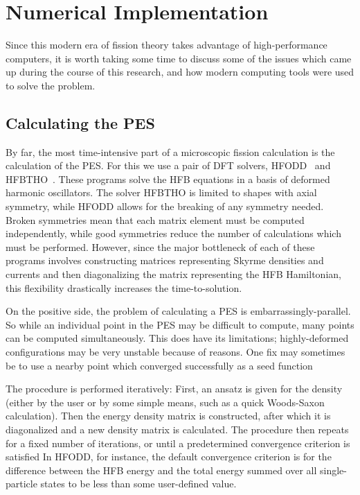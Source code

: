 \chapter{Numerical Implementation}\label{chap:Numerical}

Since this modern era of fission theory takes advantage of high-performance computers, it is worth taking some time to discuss some of the issues which came up during the course of this research, and how modern computing tools were used to solve the problem.

\section{Calculating the PES}
By far, the most time-intensive part of a microscopic fission calculation is the calculation of the PES. For this we use a pair of DFT solvers, HFODD~\cite{Schunck2017} and HFBTHO~\cite{Perez2017}. These programs solve the HFB equations in a basis of deformed harmonic oscillators. The solver HFBTHO is limited to shapes with axial symmetry, while HFODD allows for the breaking of any symmetry needed. Broken symmetries mean that each matrix element must be computed independently, while good symmetries reduce the number of calculations which must be performed. However, since the major bottleneck of each of these programs involves constructing matrices representing Skyrme densities and currents and then diagonalizing the matrix representing the HFB Hamiltonian, this flexibility drastically increases the time-to-solution.

On the positive side, the problem of calculating a PES is embarrassingly-parallel. So while an individual point in the PES may be difficult to compute, many points can be computed simultaneously. This does have its limitations; highly-deformed configurations may be very unstable because of reasons. One fix may sometimes be to use a nearby point which converged successfully as a seed function

The procedure is performed iteratively: First, an ansatz is given for the density (either by the user or by some simple means, such as a quick Woods-Saxon calculation). Then the energy density matrix is constructed, after which it is diagonalized and a new density matrix is calculated. The procedure then repeats for a fixed number of iterations, or until a predetermined convergence criterion is satisfied In HFODD, for instance, the default convergence criterion is for the difference between the HFB energy and the total energy summed over all single-particle states to be less than some user-defined value.

